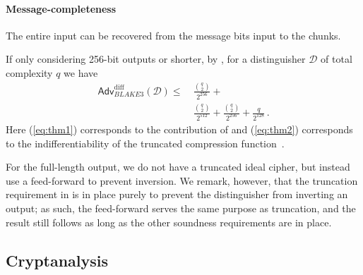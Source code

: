 \documentclass[11pt,notitlepage,a4paper]{article}
\begin{document}
\paragraph{Message-completeness}{
  The entire input can be recovered from the message bits input to the chunks.
}

If only considering 256-bit outputs or shorter, by \cite[Theorem~1]{DBLP:journals/tosc/DaemenMA18}, for a distinguisher $\mathcal{D}$ of total complexity $q$ we have
\begin{align}
  \mathsf{Adv}_{BLAKE3}^{\text{diff}}(\mathcal{D}) \le & ~\frac{\binom{q}{2}}{2^{256}} +\label{eq:thm1} \\
  & ~\frac{\binom{q}{2}}{2^{512}} + \frac{\binom{q}{2}}{2^{256}} + \frac{q}{2^{128}} \label{eq:thm2} \,.
\end{align}
Here (\ref{eq:thm1}) corresponds to the contribution of \cite[Theorem~1]{DBLP:journals/tosc/DaemenMA18} and (\ref{eq:thm2}) corresponds to the indifferentiability of the truncated compression function~\cite{DBLP:journals/tosc/LuykxMN16}.

For the full-length output, we do not have a truncated ideal cipher, but instead use a feed-forward to prevent inversion. We remark, however, that the truncation requirement in \cite[Theorem~3]{DBLP:journals/tosc/DaemenMA18} is in place purely to prevent the distinguisher from inverting an output; as such, the feed-forward serves the same purpose as truncation, and the result still follows as long as the other soundness requirements are in place.

\subsection{Cryptanalysis}\label{sec:cryptanalysis}
\end{document}
